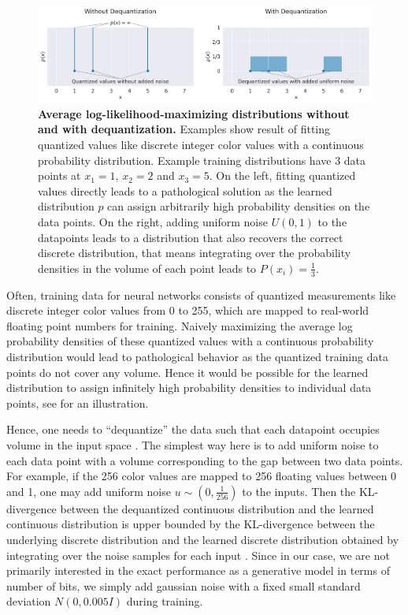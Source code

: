 \begin{figure}[ht]
    \myfloatalign
    \includegraphics[width=1\linewidth]{images/dequantization.png}
    \caption[Average log-likelihood-maximizing distributions without and with
dequantization]{
\textbf{Average log-likelihood-maximizing distributions without and with
dequantization.} Examples show result of fitting quantized values like
discrete integer color values with a continuous probability
distribution. Example training distributions have 3 data points at
$x_1=1$, $x_2=2$ and $x_3=5$. On the left, fitting quantized
values directly leads to a pathological solution as the learned
distribution $p$ can assign arbitrarily high probability densities on
the data points. On the right, adding uniform noise $U(0,1)$ to the
datapoints leads to a distribution that also recovers the correct
discrete distribution, that means integrating over the probability
densities in the volume of each point leads to $P(x_i)=\frac{1}{3}$.
}
\label{dequantization-fig}
\end{figure}

    

    Often, training data for neural networks consists of quantized
measurements like discrete integer color values from 0 to 255, which are
mapped to real-world floating point numbers for training. Naively
maximizing the average log probability densities of these quantized
values with a continuous probability distribution would lead to
pathological behavior as the quantized training data points do not cover
any volume. Hence it would be possible for the learned distribution to
assign infinitely high probability densities to individual data points,
see  for an illustration.

Hence, one needs to ``dequantize'' the data such that each datapoint
occupies volume in the input space
\citep{DBLP:journals/corr/DinhSB16,DBLP:conf/icml/HoCSDA19}.
The simplest way here is to add uniform noise to each data point with a
volume corresponding to the gap between two data points. For example, if
the 256 color values are mapped to 256 floating values between 0 and 1,
one may add uniform noise $u\sim(0,\frac{1}{256})$ to the inputs. Then
the KL-divergence between the dequantized continuous distribution and
the learned continuous distribution is upper bounded by the
KL-divergence between the underlying discrete distribution and the
learned discrete distribution obtained by integrating over the noise
samples for each input \citep{DBLP:journals/corr/TheisOB15}.
Since in our case, we are not primarily interested in the exact
performance as a generative model in terms of number of bits, we simply
add gaussian noise with a fixed small standard deviation $N(0,0.005I)$
during training.

